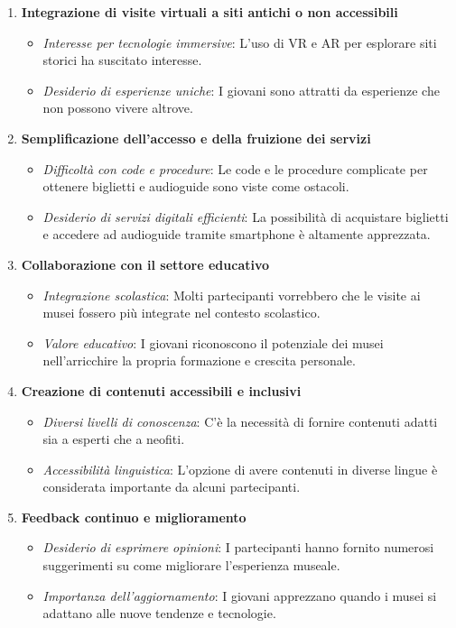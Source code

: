 \documentclass{article}
\begin{document}
\begin{enumerate}
    \item \textbf{Integrazione di visite virtuali a siti antichi o non accessibili}
        \begin{itemize}
            \item \textit{Interesse per tecnologie immersive}: L'uso di VR e AR per esplorare siti storici ha suscitato interesse.
            \item \textit{Desiderio di esperienze uniche}: I giovani sono attratti da esperienze che non possono vivere altrove.
        \end{itemize}

    \item \textbf{Semplificazione dell'accesso e della fruizione dei servizi}
        \begin{itemize}
            \item \textit{Difficoltà con code e procedure}: Le code e le procedure complicate per ottenere biglietti e audioguide sono viste come ostacoli.
            \item \textit{Desiderio di servizi digitali efficienti}: La possibilità di acquistare biglietti e accedere ad audioguide tramite smartphone è altamente apprezzata.
        \end{itemize}

    \item \textbf{Collaborazione con il settore educativo}
        \begin{itemize}
            \item \textit{Integrazione scolastica}: Molti partecipanti vorrebbero che le visite ai musei fossero più integrate nel contesto scolastico.
            \item \textit{Valore educativo}: I giovani riconoscono il potenziale dei musei nell'arricchire la propria formazione e crescita personale.
        \end{itemize}

    \item \textbf{Creazione di contenuti accessibili e inclusivi}
        \begin{itemize}
            \item \textit{Diversi livelli di conoscenza}: C'è la necessità di fornire contenuti adatti sia a esperti che a neofiti.
            \item \textit{Accessibilità linguistica}: L'opzione di avere contenuti in diverse lingue è considerata importante da alcuni partecipanti.
        \end{itemize}

    \item \textbf{Feedback continuo e miglioramento}
        \begin{itemize}
            \item \textit{Desiderio di esprimere opinioni}: I partecipanti hanno fornito numerosi suggerimenti su come migliorare l'esperienza museale.
            \item \textit{Importanza dell'aggiornamento}: I giovani apprezzano quando i musei si adattano alle nuove tendenze e tecnologie.
        \end{itemize}
\end{enumerate}
\end{document}
